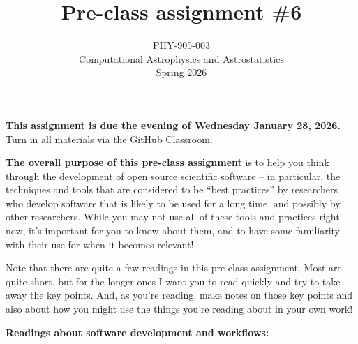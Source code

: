\documentclass[10pt]{article}
\title{Pre-class assignment \#6}
\author{PHY-905-003\\Computational Astrophysics and
  Astrostatistics\\Spring 2026}
\date{} %
\begin{document}
 
\maketitle

\vspace{-5mm}

\noindent
\textbf{This assignment is due the evening of Wednesday January 28, 2026.}
 Turn in all materials via the GitHub Classroom.

\vspace{5mm}

\noindent
\textbf{The overall purpose of this pre-class assignment} is to help
you think through the development of open source scientific software
-- in particular, the techniques and tools that are considered to be
``best practices'' by researchers who develop software that is likely
to be used for a long time, and possibly by other researchers.  While
you may not use all of these tools and practices right now, it's
important for you to know about them, and to have some familiarity
with their use for when it becomes relevant!

Note that there are quite a few readings in this pre-class assignment.
Most are quite short, but for the longer ones I want you to read
quickly and try to take away the key points.  And, as you're reading,
make notes on those key points and also about how you might use the
things you're reading about in your own work!

\vspace{5mm}

\noindent
\textbf{Readings about software development and workflows:}
\end{document}
